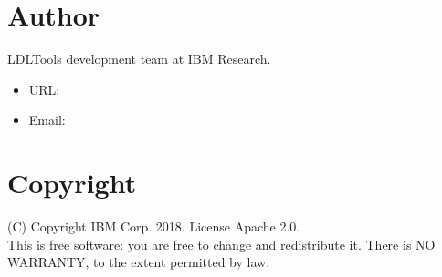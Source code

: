 \documentclass[fancy]{article}
\begin{document}
\section{Author}
LDLTools development team at IBM Research.

\begin{itemize}
\item URL: 
\item Email: 
\end{itemize}

\section{Copyright}
(C) Copyright IBM Corp. 2018.
License Apache 2.0.\\

This is free software: you are free to change and redistribute it.
There is NO  WARRANTY,  to the extent permitted by law.
\end{document}
